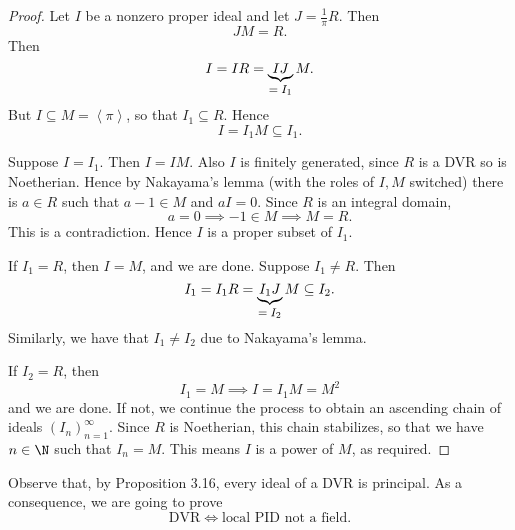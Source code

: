 \documentclass[pmath441]{subfiles}
\begin{document}
    \begin{proof}
        Let $I$ be a nonzero proper ideal and let $J = \frac{1}{\pi}R$. Then
        \begin{equation*}
            JM = R.
        \end{equation*}
        Then
        \begin{equation*}
            I = IR = \underbrace{IJ}_{\clap{\text{\footnotesize$=I_1$}}} M.
        \end{equation*}
        But $I\subseteq M = \left< \pi \right>$, so that $I_1\subseteq R$. Hence
        \begin{equation*}
            I = I_1M \subseteq I_1.
        \end{equation*}

        Suppose $I=I_1$. Then $I = IM$. Also $I$ is finitely generated, since $R$ is a DVR so is Noetherian. Hence by Nakayama's lemma (with the roles of $I,M$ switched) there is $a\in R$ such that $a-1\in M$ and $aI = 0$. Since $R$ is an integral domain,
        \begin{equation*}
            a = 0 \implies -1 \in M \implies M = R.
        \end{equation*}
        This is a contradiction. Hence $I$ is a proper subset of $I_1$.

        If $I_1=R$, then $I=M$, and we are done. Suppose $I_1\neq R$. Then
        \begin{equation*}
            I_1 = I_1R = \underbrace{I_1J}_{\clap{\text{\footnotesize$=I_2$}}}M \subseteq I_2.
        \end{equation*}
        Similarly, we have that $I_1\neq I_2$ due to Nakayama's lemma. 

        If $I_2 = R$, then
        \begin{equation*}
            I_1 = M \implies I = I_1M = M^{2}
        \end{equation*}
        and we are done. If not, we continue the process to obtain an ascending chain of ideals $\left( I_{n} \right)^{\infty}_{n=1}$. Since $R$ is Noetherian, this chain stabilizes, so that we have $n\in\N$ such that $I_n = M$. This means $I$ is a power of $M$, as required.
    \end{proof}
    
    \np Observe that, by Proposition 3.16, every ideal of a DVR is principal. As a consequence, we are going to prove
    \begin{equation*}
        \text{DVR} \iff \text{local PID not a field}.
    \end{equation*}
    
\end{document}
